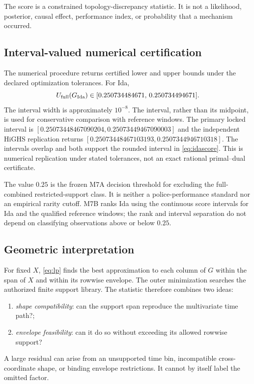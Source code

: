 \documentclass[11pt]{article}
\begin{document}
\begin{resultbox}
The score is a constrained topology-discrepancy statistic. It is not a likelihood, posterior, causal effect, performance index, or probability that a mechanism occurred.
\end{resultbox}

\subsection{Interval-valued numerical certification}

The numerical procedure returns certified lower and upper bounds under the declared optimization tolerances. For Ida,
\begin{equation}
U_{\mathrm{full}}(G_{\mathrm{Ida}})
\in[0.250734484671,\,0.250734494671].
\label{eq:idascore}
\end{equation}
The interval width is approximately $10^{-8}$. The interval, rather than its midpoint, is used for conservative comparison with reference windows.
The primary locked interval is $[0.25073448467090204,0.25073449467090003]$ and the independent HiGHS replication returns $[0.25073448467103193,0.2507344946710318]$. The intervals overlap and both support the rounded interval in \cref{eq:idascore}. This is numerical replication under stated tolerances, not an exact rational primal--dual certificate.

The value $0.25$ is the frozen M7A decision threshold for excluding the full-combined restricted-support class. It is neither a police-performance standard nor an empirical rarity cutoff. M7B ranks Ida using the continuous score intervals for Ida and the qualified reference windows; the rank and interval separation do not depend on classifying observations above or below $0.25$.

\subsection{Geometric interpretation}

For fixed $X$, \cref{eq:lp} finds the best approximation to each column of $G$ within the span of $X$ and within its rowwise envelope. The outer minimization searches the authorized finite support library. The statistic therefore combines two ideas:
\begin{enumerate}
\item \emph{shape compatibility}: can the support span reproduce the multivariate time path?;
\item \emph{envelope feasibility}: can it do so without exceeding its allowed rowwise support?
\end{enumerate}
A large residual can arise from an unsupported time bin, incompatible cross-coordinate shape, or binding envelope restrictions. It cannot by itself label the omitted factor.
\end{document}
